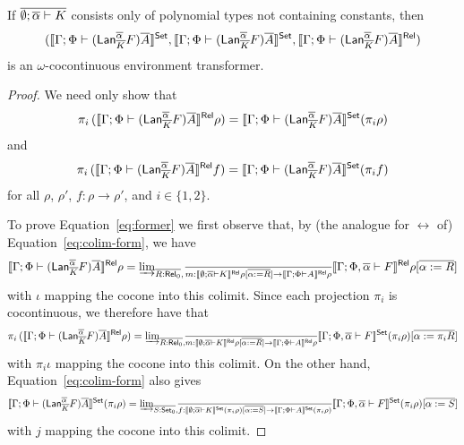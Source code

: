 \documentclass{lmcs}
\theoremstyle{plain}\newtheorem{satz}[thm]{Satz}
\newcommand{\set}{\mathsf{Set}}
\begin{document}
{\begin{prop}
If $\overline{\emptyset; \overline{\alpha} \vdash K}$ consists only of
polynomial types not containing constants, then
\[(\setsem{ \Gamma; \Phi \vdash (\Lan^{\ol \alpha}_{\ol{K}} F)\ol{A}
}, \setsem{ \Gamma; \Phi \vdash (\Lan^{\ol \alpha}_{\ol{K}} F)\ol{A} },
\relsem{ \Gamma; \Phi \vdash (\Lan^{\ol \alpha}_{\ol{K}} F)\ol{A} })\]
is an $\omega$-cocontinuous environment transformer.
\end{prop}
\begin{proof}
We need only show that
\begin{equation}\label{eq:former}
\pi_i \,( \relsem{ \Gamma; \Phi \vdash (\Lan^{\ol \alpha}_{\ol{K}} F)\ol{A}
} \rho ) = \setsem{ \Gamma; \Phi \vdash (\Lan^{\ol \alpha}_{\ol{K}}
  F)\ol{A} } (\pi_i \rho)
\end{equation}
and
\begin{equation}\label{eq:latter}
\pi_i \,( \relsem{ \Gamma; \Phi \vdash (\Lan^{\ol \alpha}_{\ol{K}} F)\ol{A}
} f ) = \setsem{ \Gamma; \Phi \vdash (\Lan^{\ol \alpha}_{\ol{K}}
  F)\ol{A} } (\pi_i f)
\end{equation}
for all $\rho$, $\rho'$, $f : \rho \to \rho'$, and $i \in \{1, 2\}$.

To prove Equation~\ref{eq:former} we first observe that, by (the
analogue for $\rel$ of) Equation~\ref{eq:colim-form}, we have
\[
\llbracket{ \Gamma; \Phi \vdash (\mathsf{Lan}^{\overline{\alpha}}_{\overline{K}} F)\overline{A} }\rrbracket^{\mathsf{Rel}} \rho =
{{\underrightarrow{\lim}}_{\overline{R : \mathsf{Rel}_0},\, \overline{m : \llbracket{ \emptyset; \overline{\alpha} \vdash K }\rrbracket^{\mathsf{Rel}}
    \rho[\overline{\alpha := R}] \to \llbracket{ \Gamma; \Phi \vdash A }\rrbracket^{\mathsf{Rel}}
    \rho}}{ \llbracket{ \Gamma; \Phi, \overline{\alpha} \vdash F }\rrbracket^{\mathsf{Rel}}
  \rho[\overline{\alpha := R}] }}
\]
with $\iota$ mapping the cocone into this colimit.  Since each
projection $\pi_i$ is cocontinuous, we therefore have that
\[
\pi_i\, ( \relsem{ \Gamma; \Phi \vdash (\Lan^{\ol \alpha}_{\ol{K}}
  F)\ol{A} } \rho ) = \colim{\ol{R : \rel_0}, \ol{m : \relsem{
      \emptyset; \ol\alpha \vdash K } \rho[\ol{\alpha := R}] \to
    \relsem{ \Gamma; \Phi \vdash A } \rho}}{ \setsem{ \Gamma; \Phi,
    \ol\alpha \vdash F } (\pi_i \rho) [\ol{\alpha := \pi_i R}]}
\]
with $\pi_i \iota$ mapping the cocone into this colimit.  On the
other hand, Equation~\ref{eq:colim-form} also gives
\[
\setsem{ \Gamma; \Phi \vdash (\Lan^{\ol \alpha}_{\ol{K}} F)\ol{A} }
(\pi_i \rho) = \colim{\ol{S : \set_0}, \ol{f : \setsem{ \emptyset;
      \ol\alpha \vdash K } (\pi_i \rho)[\ol{\alpha := S}] \to \setsem{
      \Gamma; \Phi \vdash A } (\pi_i \rho)}}{ \setsem{ \Gamma; \Phi,
    \ol\alpha \vdash F } (\pi_i \rho) [\ol{\alpha := S}]}
\]
with $j$ mapping the cocone into this colimit.


\end{proof}}
\end{document}
